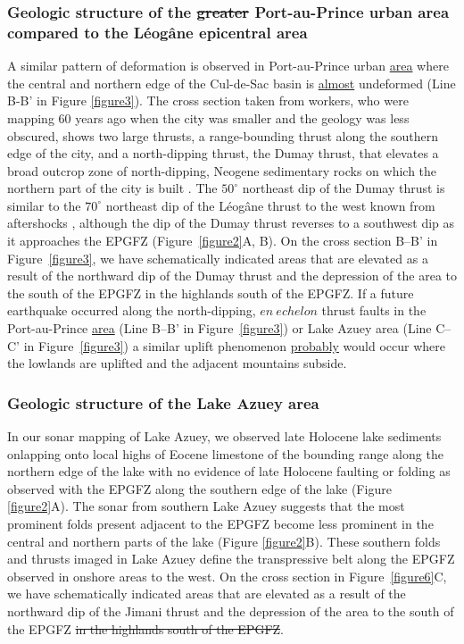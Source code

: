 \documentclass[linenumbers,draft]{agujournal}
\begin{document}
\subsubsection{Geologic structure of the \st{greater} Port-au-Prince urban area compared to the L\'eog\^ane epicentral area} 
A similar pattern of deformation is observed in Port-au-Prince urban \ul{area} where the central and northern edge of the Cul-de-Sac basin is \ul{almost} undeformed \citep{massoni1955haiti,cox2011shear,mchugh2011offshore,saint2015seismotectonics} (Line B-B' in Figure \ref{figure3}). The cross section taken from workers, who were mapping 60 years ago when the city was smaller and the geology was less obscured, shows two large thrusts, a range-bounding thrust along the southern edge of the city, and a north-dipping thrust, the Dumay thrust, that elevates a broad outcrop zone of north-dipping, Neogene sedimentary rocks on which the northern part of the city is built \citep{rathje2014geotechnical}. The $50^{\circ}$ northeast dip of the Dumay thrust is similar to the $70^{\circ}$ northeast dip of the L\'eog\^ane thrust to the west known from aftershocks \citep{douilly2013crustal,douilly2015three}, although the dip of the Dumay thrust reverses to a southwest dip as it approaches the EPGFZ (Figure~\ref{figure2}A, B). On the cross section B--B' in Figure~\ref{figure3}, we have schematically indicated areas that are elevated as a result of the northward dip of the Dumay thrust and the depression of the area to the south of the EPGFZ in the highlands south of the EPGFZ. If a future earthquake occurred along the north-dipping, $en~echelon$ thrust faults in the Port-au-Prince \ul{area} (Line B--B' in Figure~\ref{figure3}) or Lake Azuey area (Line C--C' in Figure~\ref{figure3}) a similar uplift phenomenon \ul{probably} would occur where the lowlands are uplifted and the adjacent mountains subside.

\subsubsection{Geologic structure of the Lake Azuey area} 

In our sonar mapping of Lake Azuey, we observed late Holocene lake sediments onlapping onto local highs of Eocene limestone of the bounding range along the northern edge of the lake with no evidence of late Holocene faulting or folding as observed with the EPGFZ along the southern edge of the lake (Figure \ref{figure2}A). The sonar from southern Lake Azuey suggests that the most prominent folds present adjacent to the EPGFZ become less prominent in the central and northern parts of the lake (Figure \ref{figure2}B). These southern folds and thrusts imaged in Lake Azuey define the transpressive belt along the EPGFZ observed in onshore areas to the west. On the cross section in Figure~\ref{figure6}C, we have schematically indicated areas that are elevated as a result of the northward dip of the Jimani thrust and the depression of the area to the south of the EPGFZ\st{ in the highlands south of the EPGFZ}.
\end{document}
